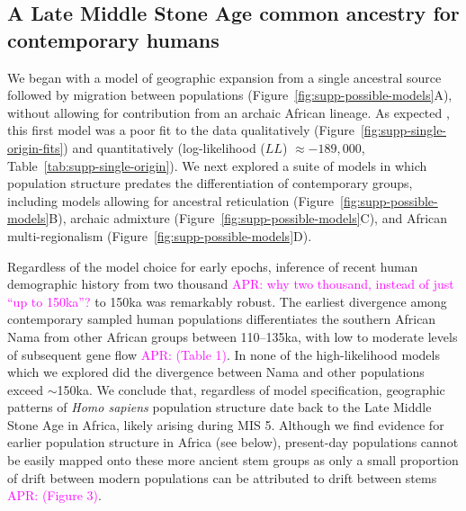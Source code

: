 \documentclass[]{article}
\newcommand{\aprcomment}[1]{{\textcolor{magenta}{APR: #1}}}
\begin{document}
\subsection*{A Late Middle Stone Age common ancestry for contemporary humans}

We began with a model of geographic expansion from a single ancestral source
followed by migration between populations
(Figure~\ref{fig:supp-possible-models}A), without allowing for contribution
from an archaic African lineage. As expected \citep{Ragsdale2019-nt}, this
first model was a poor fit to the data qualitatively
(Figure~\ref{fig:supp-single-origin-fits}) and quantitatively (log-likelihood
($LL$) $\approx -189,000$, Table~\ref{tab:supp-single-origin}). We next explored a
suite of models in which population structure predates the differentiation of
contemporary groups, including models allowing for ancestral reticulation
(Figure~\ref{fig:supp-possible-models}B), archaic admixture
(Figure~\ref{fig:supp-possible-models}C), and African multi-regionalism
(Figure~\ref{fig:supp-possible-models}D).

Regardless of the model choice for early epochs, inference of recent human
demographic history from two thousand \aprcomment{why two thousand, instead of
just ``up to 150ka''?} to 150ka was remarkably robust. The earliest divergence
among contemporary sampled human populations differentiates the southern
African Nama from other African groups between 110--135ka, with low to moderate
levels of subsequent gene flow \aprcomment{(Table 1)}. In none of the
high-likelihood models which we explored did the divergence between Nama and
other populations exceed $\sim$150ka. We conclude that, regardless of model
specification, geographic patterns of \emph{Homo sapiens} population structure
date back to the Late Middle Stone Age in Africa, likely arising during MIS 5.
Although we find evidence for earlier population structure in Africa (see
below), present-day populations cannot be easily mapped onto these more ancient
stem groups as only a small proportion of drift between modern populations can
be attributed to drift between stems \aprcomment{(Figure 3)}. 
\end{document}
